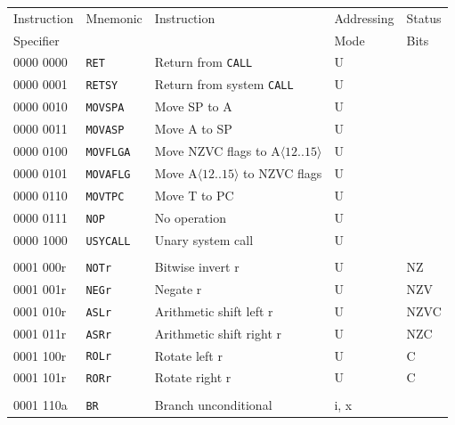 \documentclass[10pt,fleqn]{book}
\begin{document}
\begin{tabular}{ l l l l l }
\toprule
Instruction & Mnemonic       & Instruction                                 & Addressing    & Status\\
Specifier   &                &                                             & Mode          & Bits\\
\midrule

0000 0000   & \verb|RET|     & Return from \verb|CALL|                     & U \\
0000 0001   & \verb|RETSY|   & Return from system \verb|CALL|              & U \\
0000 0010   & \verb|MOVSPA|  & Move SP to A                                & U \\
0000 0011   & \verb|MOVASP|  & Move A to SP                                & U \\  
0000 0100   & \verb|MOVFLGA| & Move NZVC flags to A$\langle12..15\rangle$  & U \\
0000 0101   & \verb|MOVAFLG| & Move A$\langle12..15\rangle$ to NZVC flags  & U \\
0000 0110   & \verb|MOVTPC|  & Move T to PC                                & U \\
0000 0111   & \verb|NOP|     & No operation                                & U \\
0000 1000   & \verb|USYCALL| & Unary system call                           & U \\
 \\
0001 000r   & \verb|NOTr|    & Bitwise invert r                            & U                    & NZ \\
0001 001r   & \verb|NEGr|    & Negate r                                    & U                    & NZV \\
0001 010r   & \verb|ASLr|    & Arithmetic shift left r                     & U                    & NZVC \\
0001 011r   & \verb|ASRr|    & Arithmetic shift right r                    & U                    & NZC \\
0001 100r   & \verb|ROLr|    & Rotate left r                               & U                    & C \\
0001 101r   & \verb|RORr|    & Rotate right r                              & U                    & C \\
 \\
0001 110a   & \verb|BR|      & Branch unconditional                        & i, x \\

\end{tabular}
\end{document}

